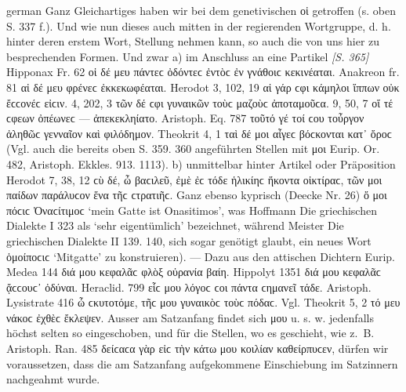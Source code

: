 \begin{otherlanguage*}{german}
Ganz Gleichartiges haben wir bei dem genetivischen οἱ getroffen (s. oben S. 337 f.). Und wie nun dieses auch mitten in der regierenden Wortgruppe, d. h. hinter deren erstem Wort, Stellung nehmen kann, so auch die von uns hier zu besprechenden Formen. Und zwar a) im Anschluss an eine Partikel \hypertarget{p365}{\emph{[S. 365]}}\label{p365} Hipponax Fr. 62 οἱ δέ μευ πάντεϲ ὀδόντεϲ ἐντὸϲ ἐν γνάθοιϲ κεκινέαται. Anakreon fr. 81 αἱ δέ μευ φρένεϲ ἐκκεκωφέαται. Herodot 3, 102, 19 αἱ γάρ ϲφι κάμηλοι ἵππων οὐκ ἔϲϲονέϲ εἰϲιν. 4, 202, 3 τῶν δέ ϲφι γυναικῶν τοὺϲ μαζοὺϲ ἀποταμοῦϲα. 9, 50, 7 οἵ τέ ϲφεων ὀπέωνεϲ — ἀπεκεκληίατο. Aristoph. Eq. 787 τοῦτό γέ τοί ϲου τοὖργον ἀληθῶϲ γενναῖον καὶ φιλόδημον. Theokrit 4, 1 ταὶ δέ μοι αἶγεϲ βόϲκονται κατ᾽ ὄροϲ (Vgl. auch die bereits oben S. 359. 360 angeführten Stellen mit μοι Eurip. Or. 482, Aristoph. Ekkles. 913. 1113). b) unmittelbar hinter Artikel oder Präposition Herodot 7, 38, 12 ϲὺ δέ, ὦ βαϲιλεῦ, ἐμὲ ἐϲ τόδε ἡλικίηϲ ἥκοντα οἰκτίραϲ, τῶν μοι παίδων παράλυϲον ἕνα τῆϲ ϲτρατιῆϲ. Ganz ebenso kyprisch (Deecke Nr. 26) ὄ μοι πόϲιϲ Ὀναϲίτιμοϲ ‘mein Gatte ist Onasitimos’, was Hoffmann Die griechischen Dialekte I 323 als ‘sehr eigentümlich’ bezeichnet, während Meister Die griechischen Dialekte II 139. 140, sich sogar genötigt glaubt, ein neues Wort ὁμοίποϲιϲ ‘Mitgatte’ zu konstruieren). — Dazu aus den attischen Dichtern Eurip. Medea 144 διά μου κεφαλᾶϲ φλὸξ οὐρανία βαίη. Hippolyt 1351 διά μου κεφαλᾶϲ ᾄϲϲουϲ᾽ ὀδύναι. Heraclid. 799 εἷϲ μου λόγοϲ ϲοι πάντα ϲημανεῖ τάδε. Aristoph. Lysistrate 416 ὦ ϲκυτοτόμε, τῆϲ μου γυναικὸϲ τοὺϲ πόδαϲ. Vgl. Theokrit 5, 2 τό μευ νάκοϲ ἐχθὲϲ ἔκλεψεν. Ausser am Satzanfang findet sich μου u. s. w. jedenfalls höchst selten so eingeschoben, und für die Stellen, wo es geschieht, wie z.~B. Aristoph. Ran. 485 δείϲαϲα γὰρ εἰϲ τὴν κάτω μου κοιλίαν καθείρπυϲεν, dürfen wir voraussetzen, dass die am Satzanfang aufgekommene Einschiebung im Satzinnern nachgeahmt wurde.


\end{otherlanguage*}
